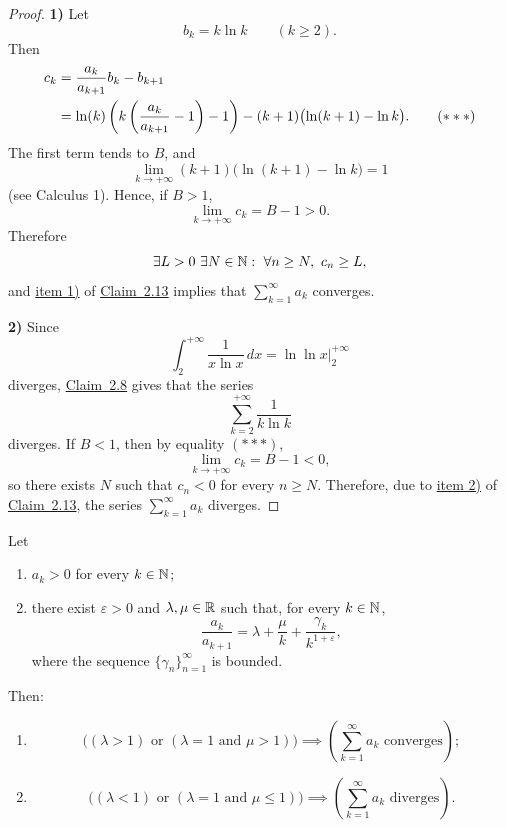 \begin{proof}
\textbf{1)} Let
\[
b_k=k\ln k\qquad(k\ge2).
\]
Then
\begin{align}
 c_k
 &=\frac{a_k}{a_{k+1}}b_k-b_{k+1}\notag\\
 &=\ln(k)\left(k\left(\frac{a_k}{a_{k+1}}-1\right)-1\right)
 -(k+1)\bigl(\ln(k+1)-\ln k\bigr).
 \tag{$***$}\label{eq:2:starstarstar:1}
\end{align}
The first term tends to $B$, and
\[
\lim_{k\to+\infty}(k+1)\bigl(\ln(k+1)-\ln k\bigr)=1
\]
(see Calculus 1). Hence, if $B>1$,
\[
\lim_{k\to+\infty}c_k=B-1>0.
\]
Therefore
\[
\exists L>0\ \exists N\in\N:\ \forall n\ge N,\ c_n\ge L,
\]
and \hyperref[item:claim:2.13:1]{item 1)} of \hyperref[claim:2.13]{Claim~2.13} implies that $\sum_{k=1}^{\infty}a_k$ converges.

\medskip
\noindent\textbf{2)} Since
\[
\int_2^{+\infty}\frac1{x\ln x}\,dx
=\left.\ln\ln x\right|_2^{+\infty}
\]
diverges, \hyperref[claim:2.8]{Claim~2.8} gives that the series
\[
\sum_{k=2}^{+\infty}\frac1{k\ln k}
\]
diverges. If $B<1$, then by equality \hyperref[eq:2:starstarstar:1]{$(***)$},
\[
\lim_{k\to+\infty}c_k=B-1<0,
\]
so there exists $N$ such that $c_n<0$ for every $n\ge N$. Therefore, due to \hyperref[item:claim:2.13:2]{item 2)} of \hyperref[claim:2.13]{Claim~2.13}, the series $\sum_{k=1}^{\infty}a_k$ diverges.
\end{proof}

\begin{claim}\label{claim:2.15}
Let
\begin{enumerate}[label=\alph*)]
\item\label{item:claim:2.15:a} $a_k>0$ for every $k\in\mathbb{N}$;
\item\label{item:claim:2.15:b} there exist $\varepsilon>0$ and $\lambda,\mu\in\mathbb{R}$ such that, for every $k\in\mathbb{N}$,
\[
\frac{a_k}{a_{k+1}}
=\lambda+\frac{\mu}{k}+\frac{\gamma_k}{k^{1+\varepsilon}},
\]
where the sequence $\{\gamma_n\}_{n=1}^{\infty}$ is bounded.
\end{enumerate}
Then:
\begin{enumerate}[label=\arabic*)]
\item\label{item:claim:2.15:1}
\[
\bigl((\lambda>1)\text{ or }(\lambda=1\text{ and }\mu>1)\bigr)
\implies
\left(\sum_{k=1}^{\infty}a_k\text{ converges}\right);
\]
\item\label{item:claim:2.15:2}
\[
\bigl((\lambda<1)\text{ or }(\lambda=1\text{ and }\mu\le1)\bigr)
\implies
\left(\sum_{k=1}^{\infty}a_k\text{ diverges}\right).
\]
\end{enumerate}
\end{claim}

